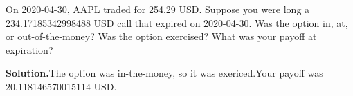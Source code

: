 \noindent On 2020-04-30, AAPL traded for 254.29 USD. Suppose you were long a 234.17185342998488 USD call that expired on 2020-04-30. Was the option in, at, or out-of-the-money? Was the option exercised? What was your payoff at expiration?

\vspace{9pt} 

\textbf{Solution.}The option was in-the-money, so it was exericed.Your payoff was 20.118146570015114 USD.
